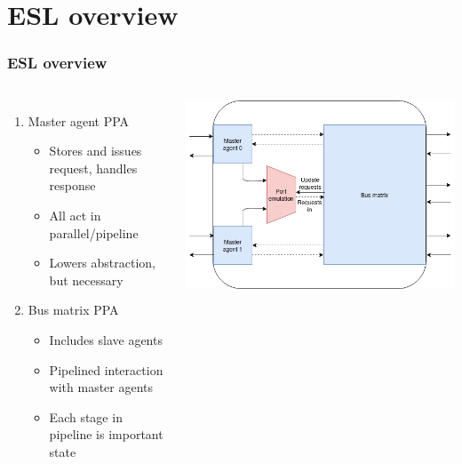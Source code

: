 \documentclass[]{beamer}
\begin{document}
       \section{ESL overview}
         \begin{frame}
          \frametitle{ESL overview}
          \begin{columns}
             \begin{enumerate}
              \item<1-> Master agent PPA
               \begin{itemize}
                \item<1-> Stores and issues request, handles response
                \item<1-> All act in parallel/pipeline
                \item<1-> Lowers abstraction, but necessary
               \end{itemize}
              \item<2-> Bus matrix PPA
                \begin{itemize}
                \item<2-> Includes slave agents
                \item<2-> Pipelined interaction with master agents
                \item<2-> Each stage in pipeline is important state
               \end{itemize}
             \end{enumerate}
             \includegraphics[width=\textwidth]{pics/ESL_overview_2.png}
          \end{columns}
         \end{frame}
\end{document}
